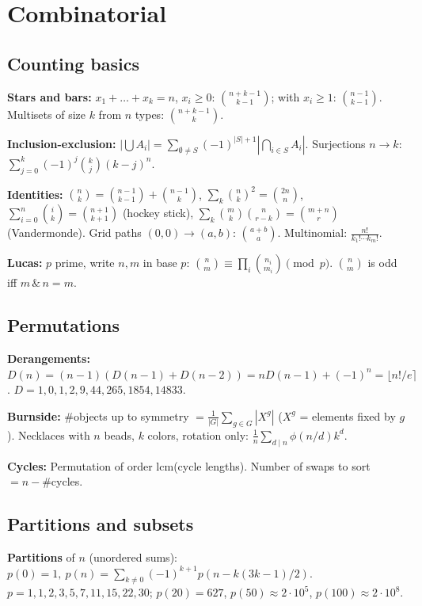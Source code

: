 \chapter{Combinatorial}


\section{Counting basics}
	\textbf{Stars and bars:} $x_1+\dots+x_k=n$, $x_i \ge 0$: $\binom{n+k-1}{k-1}$;
	with $x_i \ge 1$: $\binom{n-1}{k-1}$. Multisets of size $k$ from $n$ types: $\binom{n+k-1}{k}$.

	\textbf{Inclusion-exclusion:} $|\bigcup A_i| = \sum_{\emptyset\ne S}(-1)^{|S|+1}|\bigcap_{i\in S}A_i|$.
	Surjections $n \to k$: $\sum_{j=0}^{k}(-1)^j\binom{k}{j}(k-j)^n$.

	\textbf{Identities:} $\binom{n}{k}=\binom{n-1}{k-1}+\binom{n-1}{k}$,
	$\sum_k \binom{n}{k}^2=\binom{2n}{n}$, $\sum_{i=0}^{n}\binom{i}{k}=\binom{n+1}{k+1}$ (hockey stick),
	$\sum_k\binom{m}{k}\binom{n}{r-k}=\binom{m+n}{r}$ (Vandermonde).
	Grid paths $(0,0)\to(a,b)$: $\binom{a+b}{a}$. Multinomial: $\frac{n!}{k_1!\cdots k_m!}$.

	\textbf{Lucas:} $p$ prime, write $n, m$ in base $p$: $\binom{n}{m} \equiv \prod_i\binom{n_i}{m_i} \pmod p$.
	$\binom{n}{m}$ is odd iff $m \,\&\, n = m$.

\section{Permutations}
	\textbf{Derangements:} $D(n) = (n-1)(D(n-1)+D(n-2)) = nD(n-1)+(-1)^n = \lfloor n!/e \rceil$.
	$D = 1, 0, 1, 2, 9, 44, 265, 1854, 14833$.

	\textbf{Burnside:} \#objects up to symmetry $= \frac{1}{|G|}\sum_{g\in G}|X^g|$
	($X^g$ = elements fixed by $g$). Necklaces with $n$ beads, $k$ colors, rotation only:
	$\frac1n\sum_{d\mid n}\phi(n/d)k^d$.

	\textbf{Cycles:} Permutation of order $\text{lcm}$(cycle lengths). Number of swaps to sort $= n - \#$cycles.

\section{Partitions and subsets}
	\textbf{Partitions} of $n$ (unordered sums):
	$p(0)=1,\ p(n)=\sum_{k\ne0}(-1)^{k+1}p(n-k(3k-1)/2)$.
	$p = 1,1,2,3,5,7,11,15,22,30$; $p(20)=627$, $p(50)\approx2\cdot10^5$, $p(100)\approx2\cdot10^8$.

